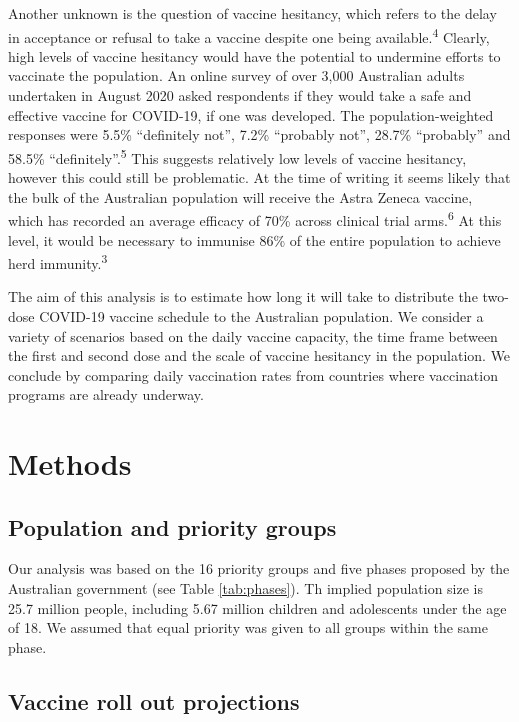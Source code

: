 \documentclass{article}
\begin{document}
Another unknown is the question of vaccine hesitancy, which refers to
the delay in acceptance or refusal to take a vaccine despite one being
available.\textsuperscript{4} Clearly, high levels of vaccine hesitancy
would have the potential to undermine efforts to vaccinate the
population. An online survey of over 3,000 Australian adults undertaken
in August 2020 asked respondents if they would take a safe and effective
vaccine for COVID-19, if one was developed. The population-weighted
responses were 5.5\% ``definitely not'', 7.2\% ``probably not'', 28.7\%
``probably'' and 58.5\% ``definitely''.\textsuperscript{5} This suggests
relatively low levels of vaccine hesitancy, however this could still be
problematic. At the time of writing it seems likely that the bulk of the
Australian population will receive the Astra Zeneca vaccine, which has
recorded an average efficacy of 70\% across clinical trial
arms.\textsuperscript{6} At this level, it would be necessary to
immunise 86\% of the entire population to achieve herd
immunity.\textsuperscript{3}

The aim of this analysis is to estimate how long it will take to
distribute the two-dose COVID-19 vaccine schedule to the Australian
population. We consider a variety of scenarios based on the daily
vaccine capacity, the time frame between the first and second dose and
the scale of vaccine hesitancy in the population. We conclude by
comparing daily vaccination rates from countries where vaccination
programs are already underway.

\hypertarget{methods}{%
\section{Methods}\label{methods}}

\hypertarget{population-and-priority-groups}{%
\subsection{Population and priority
groups}\label{population-and-priority-groups}}

Our analysis was based on the 16 priority groups and five phases
proposed by the Australian government (see Table \ref{tab:phases}). Th
implied population size is 25.7 million people, including 5.67 million
children and adolescents under the age of 18. We assumed that equal
priority was given to all groups within the same phase.

\hypertarget{vaccine-roll-out-projections}{%
\subsection{Vaccine roll out
projections}\label{vaccine-roll-out-projections}}
\end{document}
